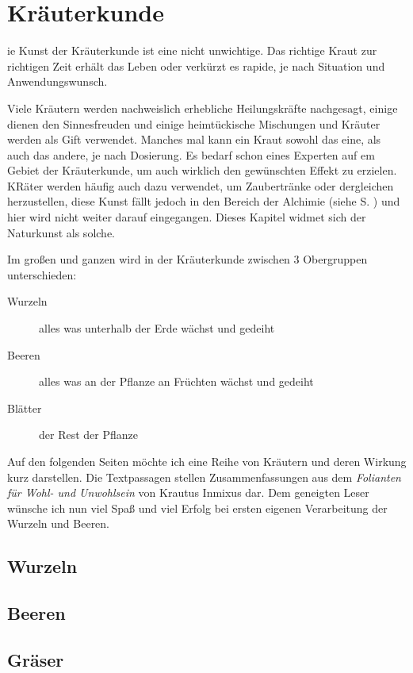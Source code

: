 \chapter{Kräuterkunde}
\label{kraeuterkunde}
ie Kunst
der Kräuterkunde ist eine nicht unwichtige. Das richtige Kraut zur
richtigen Zeit erhält das Leben oder verkürzt es rapide, je nach
Situation und Anwendungswunsch.
\par Viele Kräutern werden nachweislich erhebliche Heilungskräfte
nachgesagt, einige dienen den Sinnesfreuden und einige heimtückische
Mischungen und Kräuter werden als Gift verwendet. Manches mal kann
ein Kraut sowohl das eine, als auch das andere, je nach Dosierung.
Es bedarf schon eines Experten auf em Gebiet der Kräuterkunde, um
auch wirklich den gewünschten Effekt zu erzielen. KRäter werden
häufig auch dazu verwendet, um Zaubertränke oder dergleichen
herzustellen, diese Kunst fällt jedoch in den Bereich der Alchimie
(siehe S. \pageref{alchimie}) und hier wird nicht weiter darauf
eingegangen. Dieses Kapitel widmet sich der Naturkunst als solche.

\par Im großen und ganzen wird in der Kräuterkunde zwischen 3
Obergruppen unterschieden:
\begin{description}
\item [Wurzeln] alles was unterhalb der Erde wächst und gedeiht
\item [Beeren] alles was an der Pflanze an Früchten wächst und
gedeiht
\item [Blätter] der Rest der Pflanze
\end{description}

\par Auf den folgenden Seiten möchte ich eine Reihe von Kräutern und
deren Wirkung kurz darstellen. Die Textpassagen stellen
Zusammenfassungen aus dem \textit{Folianten für Wohl- und
Unwohlsein} von \mbox{Krautus} \mbox{Inmixus} dar. Dem geneigten
Leser wünsche ich nun viel Spaß und viel Erfolg bei ersten eigenen
Verarbeitung der Wurzeln und Beeren.

\section{Wurzeln}

\section{Beeren}

\section{Gräser}
